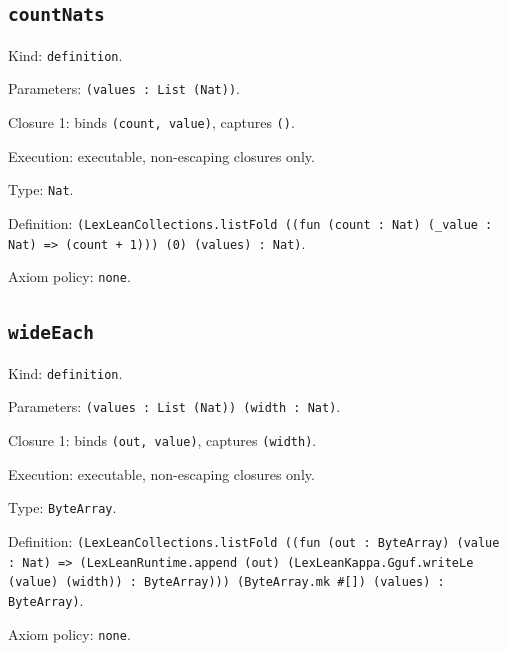 \documentclass[11pt]{article}
\begin{document}
\subsection*{\texttt{countNats}}
\noindent Kind: \texttt{definition}.\par
\noindent Parameters: \texttt{(values : List (Nat))}.\par
\noindent Closure 1: binds \texttt{(count, value)}, captures \texttt{()}.\par
\noindent Execution: executable, non-escaping closures only.\par
\noindent Type: \texttt{Nat}.\par
\noindent Definition: \texttt{(LexLeanCollections.listFold ((fun (count : Nat) (\_value : Nat) => (count + 1))) (0) (values) : Nat)}.\par
\noindent Axiom policy: \texttt{none}.\par
\subsection*{\texttt{wideEach}}
\noindent Kind: \texttt{definition}.\par
\noindent Parameters: \texttt{(values : List (Nat)) (width : Nat)}.\par
\noindent Closure 1: binds \texttt{(out, value)}, captures \texttt{(width)}.\par
\noindent Execution: executable, non-escaping closures only.\par
\noindent Type: \texttt{ByteArray}.\par
\noindent Definition: \texttt{(LexLeanCollections.listFold ((fun (out : ByteArray) (value : Nat) => (LexLeanRuntime.append (out) (LexLeanKappa.Gguf.writeLe (value) (width)) : ByteArray))) (ByteArray.mk \#[]) (values) : ByteArray)}.\par
\noindent Axiom policy: \texttt{none}.\par
\end{document}
